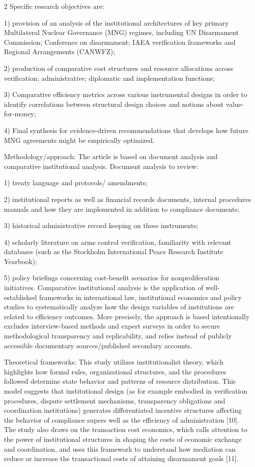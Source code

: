 \begin{multicols}{2}
Specific research objectives are:

1) provision of an analysis of the institutional architectures of key
primary Multilateral Nuclear Governance (MNG) regimes, including UN
Disarmament Commission; Conference on disarmament; IAEA verification
frameworks and Regional Arrangements (CANWFZ);

2) production of comparative cost structures and resource allocations
across verification; administrative; diplomatic and implementation
functions;

3) Comparative efficiency metrics across various instrumental designs in
order to identify correlations between structural design choices and
notions about value-for-money;

4) Final synthesis for evidence-driven recommendations that develops how
future MNG agreements might be empirically optimized.

Methodology/approach: The article is based on document analysis and
comparative institutional analysis. Document analysis to review:

1) treaty language and protocols/ amendments;

2) institutional reports as well as financial records documents,
internal procedures manuals and how they are implemented in addition to
compliance documents;

3) historical administrative record keeping on these instruments;

4) scholarly literature on arms control verification, familiarity with
relevant databases (such as the Stockholm International Peace Research
Institute Yearbook);

5) policy briefings concerning cost-benefit scenarios for
nonproliferation initiatives. Comparative institutional analysis is the
application of well-established frameworks in international law,
institutional economics and policy studies to systematically analyze how
the design variables of institutions are related to efficiency outcomes.
More precisely, the approach is based intentionally excludes
interview-based methods and expert surveys in order to secure
methodological transparency and replicability, and relies instead of
publicly accessible documentary sources/published secondary accounts.

Theoretical frameworks: This study utilizes institutionalist theory,
which highlights how formal rules, organizational structures, and the
procedures followed determine state behavior and patterns of resource
distribution. This model suggests that institutional design (as for
example embodied in verification procedures, dispute settlement
mechanisms, transparency obligations and coordination institutions)
generates differentiated incentive structures affecting the behavior of
compliance supers well as the efficiency of administration {[}10{]}. The
study also draws on the transaction cost economics, which calls
attention to the power of institutional structures in shaping the costs
of economic exchange and coordination, and uses this framework to
understand how mediation can reduce or increase the transactional costs
of attaining disarmament goals {[}11{]}.


\end{multicols}
